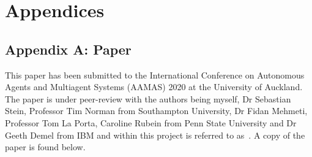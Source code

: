 \chapter*{Appendices}
\section*{Appendix A: Paper} \label{app:aamas_paper} %
This paper has been submitted to the International Conference on Autonomous Agents and Multiagent Systems (AAMAS)
2020 at the University of Auckland. The paper is under peer-review with the authors being myself, Dr Sebastian Stein,
Professor Tim Norman from Southampton University, Dr Fidan Mehmeti, Professor Tom La Porta, Caroline Rubein from
Penn State University and Dr Geeth Demel from IBM and within this project is referred to
as~\cite{FlexibleResourceAllocation}. A copy of the paper is found below.










